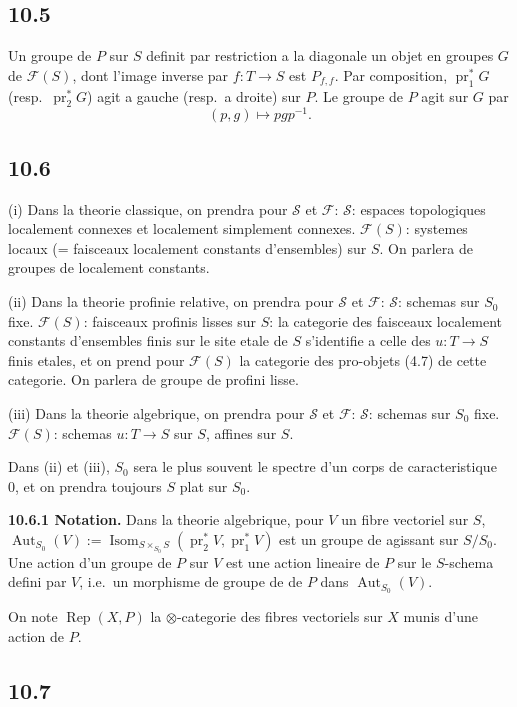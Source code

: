 \documentclass[12pt,a4paper]{article}
\theoremstyle{plain}
\theoremstyle{definition}
\theoremstyle{remark}
\DeclareMathOperator{\Isom}{Isom}
\DeclareMathOperator{\Aut}{Aut}
\DeclareMathOperator{\pr}{pr}
\DeclareMathOperator{\Rep}{Rep}
\begin{document}
\subsection*{10.5}

Un groupe de $P$ sur $S$ definit par restriction a la diagonale un objet en groupes $G$ de $\mathcal{F}(S)$, dont l'image inverse par $f: T \to S$ est $P_{f,f}$. Par composition, $\pr_1^* G$ (resp.~$\pr_2^* G$) agit a gauche (resp.~a droite) sur $P$. Le groupe de $P$ agit sur $G$ par
$$(p, g) \longmapsto pgp^{-1}.$$

\subsection*{10.6}

(i) Dans la theorie classique, on prendra pour $\mathcal{S}$ et $\mathcal{F}$:
$\mathcal{S}$: espaces topologiques localement connexes et localement simplement connexes.
$\mathcal{F}(S)$: systemes locaux (= faisceaux localement constants d'ensembles) sur $S$.
On parlera de groupes de localement constants.

(ii) Dans la theorie profinie relative, on prendra pour $\mathcal{S}$ et $\mathcal{F}$:
$\mathcal{S}$: schemas sur $S_0$ fixe.
$\mathcal{F}(S)$: faisceaux profinis lisses sur $S$: la categorie des faisceaux localement constants d'ensembles finis sur le site etale de $S$ s'identifie a celle des $u: T \to S$ finis etales, et on prend pour $\mathcal{F}(S)$ la categorie des pro-objets (4.7) de cette categorie.
On parlera de groupe de profini lisse.

(iii) Dans la theorie algebrique, on prendra pour $\mathcal{S}$ et $\mathcal{F}$:
$\mathcal{S}$: schemas sur $S_0$ fixe.
$\mathcal{F}(S)$: schemas $u: T \to S$ sur $S$, affines sur $S$.

Dans (ii) et (iii), $S_0$ sera le plus souvent le spectre d'un corps de caracteristique 0, et on prendra toujours $S$ plat sur $S_0$.

\textbf{10.6.1 Notation.} Dans la theorie algebrique, pour $V$ un fibre vectoriel sur $S$, $\Aut_{S_0}(V) := \Isom_{S \times_{S_0} S}(\pr_2^* V, \pr_1^* V)$ est un groupe de agissant sur $S/S_0$. Une action d'un groupe de $P$ sur $V$ est une action lineaire de $P$ sur le $S$-schema defini par $V$, i.e.~un morphisme de groupe de de $P$ dans $\Aut_{S_0}(V)$.

On note $\Rep(X, P)$ la $\otimes$-categorie des fibres vectoriels sur $X$ munis d'une action de $P$.

\subsection*{10.7}
\end{document}
